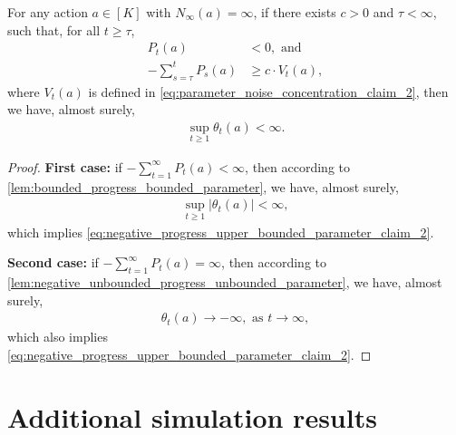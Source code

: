\begin{lemma}
\label{lem:negative_progress_upper_bounded_parameter}
For any action $a \in [K]$ with $N_\infty(a) = \infty$, if there exists $c > 0$ and $\tau < \infty$, such that, for all $t \ge \tau$,
\begin{align}
\label{eq:negative_progress_upper_bounded_parameter_claim_1a}
    P_t(a) &< 0, \text{ and} \\
\label{eq:negative_progress_upper_bounded_parameter_claim_1b}
    - \sum_{s=\tau}^{t} P_s(a) &\ge c \cdot V_t(a),
\end{align}
where $V_t(a)$ is defined in \cref{eq:parameter_noise_concentration_claim_2}, 
then we have, almost surely,
\begin{align}
\label{eq:negative_progress_upper_bounded_parameter_claim_2}
    \sup_{t \ge 1}{ \theta_t(a) } < \infty.
\end{align}
\end{lemma}
\begin{proof}
\textbf{First case:} if $ - \sum_{t=1}^{\infty} P_t(a) < \infty$, then according to \cref{lem:bounded_progress_bounded_parameter}, we have, almost surely,
\begin{align}
\label{eq:negative_progress_upper_bounded_parameter_proof_1}
    \sup_{t \ge 1}{ |\theta_t(a)| } < \infty,
\end{align}
which implies \cref{eq:negative_progress_upper_bounded_parameter_claim_2}.

\textbf{Second case:} if $- \sum_{t=1}^{\infty} P_t(a) = \infty$, then according to \cref{lem:negative_unbounded_progress_unbounded_parameter}, we have, almost surely,
\begin{align}
\label{eq:negative_progress_upper_bounded_parameter_proof_2}
    \theta_t(a) \to - \infty, \text{ as } t \to \infty,
\end{align}
which also implies \cref{eq:negative_progress_upper_bounded_parameter_claim_2}.
\end{proof}



\clearpage
\section{Additional simulation results}
\label{app:sim}

